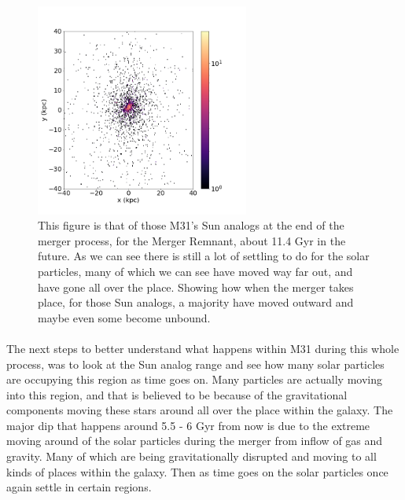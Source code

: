 \documentclass[fleqn,usenatbib]{mnras}
\begin{document}
\begin{figure}
\graphicspath{ {/home/} }
\includegraphics[width=7cm, height=7cm]{FaceOn_Density800}
\caption{This figure is that of those M31's Sun analogs at the end of the merger process, for the Merger Remnant, about 11.4 Gyr in the future. As we can see there is still a lot of settling to do for the solar particles, many of which we can see have moved way far out, and have gone all over the place. Showing how when the merger takes place, for those Sun analogs, a majority have moved outward and maybe even some become unbound.
}

\end{figure}


\paragraph{}
The next steps to better understand what happens within M31 during this whole process, was to look at the Sun analog range and see how many solar particles are occupying this region as time goes on. Many particles are actually moving into this region, and that is believed to be because of the gravitational components moving these stars around all over the place within the galaxy. The major dip that happens around 5.5 - 6 Gyr from now is due to the extreme moving around of the solar particles during the merger from inflow of gas and gravity. Many of which are being gravitationally disrupted and moving to all kinds of places within the galaxy. Then as time goes on the solar particles once again settle in certain regions.
\end{document}
